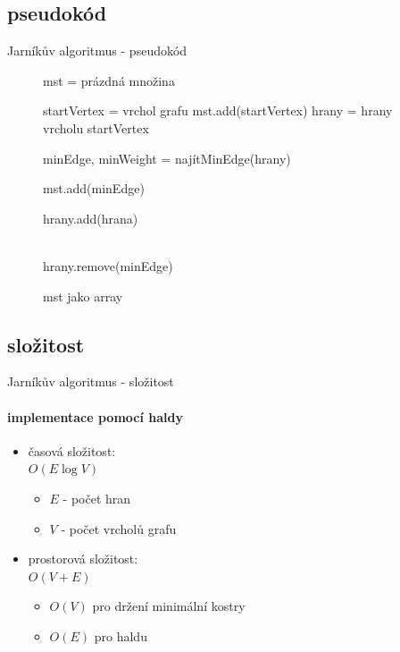 \documentclass{beamer}
\begin{document}
\subsection{pseudokód}
\begin{frame}{Jarníkův algoritmus - pseudokód}
    \begin{figure}
        \begin{algorithmic}[0]
            \State mst = prázdná množina 

            \State startVertex = vrchol grafu
            \State mst.add(startVertex)
            \State hrany = hrany vrcholu startVertex
    
                \State minEdge, minWeight = najítMinEdge(hrany)
                
                \State mst.add(minEdge)
                  
                        \State hrany.add(hrana)
                    \EndIf
                \EndFor
    
                \\ 
                \State hrany.remove(minEdge)
            \EndWhile
    
            \Return mst jako array
            \EndProcedure
        \end{algorithmic}
    \end{figure}
\end{frame}

\subsection{složitost}
\begin{frame}{Jarníkův algoritmus - složitost}
\framesubtitle{implementace pomocí haldy}
    \begin{itemize}
        \item časová složitost: \\
            $O(E \log V)$
            \begin{itemize}
                \item $E$ - počet hran 
                \item $V$ - počet vrcholů grafu
            \end{itemize}
        \item prostorová složitost: \\
            $O(V + E)$
            \begin{itemize}
                \item $O(V)$ pro držení minimální kostry
                \item $O(E)$ pro haldu
            \end{itemize}
    \end{itemize}
\end{frame}
\end{document}
